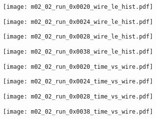 \documentclass[11pt, ngerman, fleqn, DIV=15, headinclude, BCOR=2cm]{scrreprt}
\begin{document}
\begin{appendix}
	\clearpage



	\begin{figure}
		\centering
	\begin{subfigure}[a]{0.45 \textwidth}
		\texttt{[image: m02\_02\_run\_0x0020\_wire\_le\_hist.pdf]}
		\caption{%
		}
		\label{fig:m02_02_run_0x0020_wire_le_hist}
	\end{subfigure}
	\begin{subfigure}[a]{0.45 \textwidth}
		\texttt{[image: m02\_02\_run\_0x0024\_wire\_le\_hist.pdf]}
		\caption{%
		}
		\label{fig:m02_02_run_0x0024_wire_le_hist}
	\end{subfigure}
	\begin{subfigure}[a]{0.45 \textwidth}
		\texttt{[image: m02\_02\_run\_0x0028\_wire\_le\_hist.pdf]}
		\caption{%
		}
		\label{fig:m02_02_run_0x0028_wire_le_hist}
	\end{subfigure}
	\begin{subfigure}[a]{0.45 \textwidth}
		\texttt{[image: m02\_02\_run\_0x0038\_wire\_le\_hist.pdf]}
		\caption{%
		}
		\label{fig:m02_02_run_0x0038_wire_le_hist}
	\end{subfigure}
	\caption{%
	}
	\label{fig:m02_02_wire_le_hist}
	\end{figure}


	\begin{figure}
		\centering
	\begin{subfigure}[a]{0.45 \textwidth}
		\texttt{[image: m02\_02\_run\_0x0020\_time\_vs\_wire.pdf]}
		\caption{%
		}
		\label{fig:m02_02_run_0x0020_time_vs_wire}
	\end{subfigure}
	\begin{subfigure}[a]{0.45 \textwidth}
		\texttt{[image: m02\_02\_run\_0x0024\_time\_vs\_wire.pdf]}
		\caption{%
		}
		\label{fig:m02_02_run_0x0024_time_vs_wire}
	\end{subfigure}
	\begin{subfigure}[a]{0.45 \textwidth}
		\texttt{[image: m02\_02\_run\_0x0028\_time\_vs\_wire.pdf]}
		\caption{%
		}
		\label{fig:m02_02_run_0x0028_time_vs_wire}
	\end{subfigure}
	\begin{subfigure}[a]{0.45 \textwidth}
		\texttt{[image: m02\_02\_run\_0x0038\_time\_vs\_wire.pdf]}
		\caption{%
		}
		\label{fig:m02_02_run_0x0038_time_vs_wire}
	\end{subfigure}
	\caption{%
	}
	\label{fig:m02_02_time_vs_wire}
	\end{figure}


\end{appendix}
\end{document}
